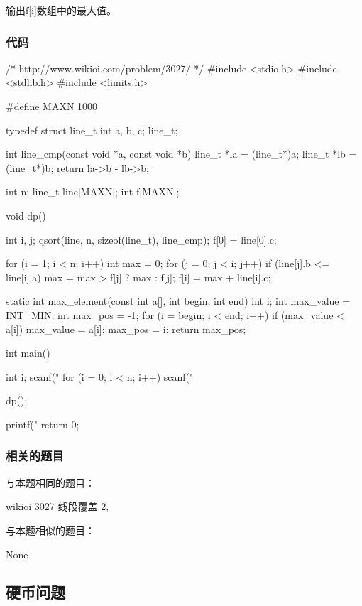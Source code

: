 输出f[i]数组中的最大值。

\subsubsection{代码}

\begin{Codex}[label=lines_cover.c]
/* http://www.wikioi.com/problem/3027/ */
#include <stdio.h>
#include <stdlib.h>
#include <limits.h>

#define MAXN 1000

typedef struct line_t {
    int a, b, c;
} line_t;

int line_cmp(const void *a, const void *b) {
    line_t *la = (line_t*)a;
    line_t *lb = (line_t*)b;
    return la->b - lb->b;
}

int n;
line_t line[MAXN];
int f[MAXN];

void dp() {
    int i, j;
    qsort(line, n, sizeof(line_t), line_cmp);
    f[0] = line[0].c;

    for (i = 1; i < n; i++) {
        int max = 0;
        for (j = 0; j < i; j++) {
            if (line[j].b <= line[i].a) max = max > f[j] ? max : f[j];
        }
        f[i] = max + line[i].c;
    }
}


static int max_element(const int a[], int begin, int end) {
    int i;
    int max_value = INT_MIN;
    int max_pos = -1;
    for (i = begin; i < end; i++) {
        if (max_value < a[i]) {
            max_value = a[i];
            max_pos = i;
        }
    }
    return max_pos;
}


int main() {
    int i;
    scanf("%
    for (i = 0; i < n; i++) scanf("%

    dp();

    printf("%
    return 0;
}
\end{Codex}

\subsubsection{相关的题目}
与本题相同的题目：
\begindot
\item  wikioi 3027 线段覆盖 2, 
\myenddot

与本题相似的题目：
\begindot
\item  None
\myenddot


\subsection{硬币问题}


